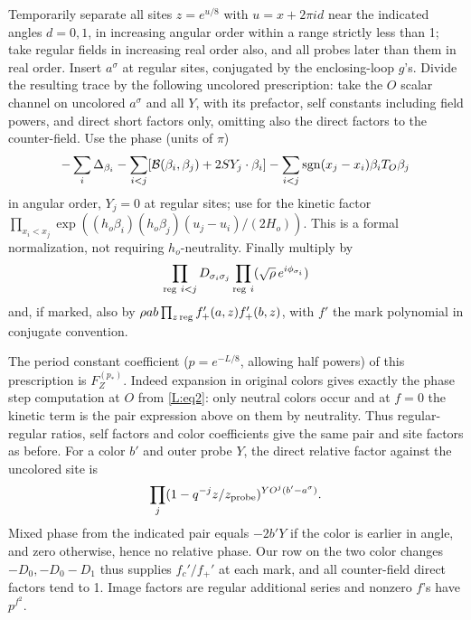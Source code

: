 \documentclass[11pt]{article}
\numberwithin{equation}{section}
\theoremstyle{definition}\newtheorem{definition}[theorem]{Definition}
\theoremstyle{remark}\newtheorem{remark}[theorem]{Remark}
\begin{document}
Temporarily separate all sites \(z=e^{u/8}\) with \(u=x+2\pi i d\) near the indicated angles \(d=0,1\), in increasing angular order within a range strictly less than 1; take regular fields in increasing real order also, and all probes later than them in real order. Insert \(a^\sigma\) at regular sites, conjugated by the enclosing-loop \(g\)'s. Divide the resulting trace by the following uncolored prescription: take the \(O\) scalar channel on uncolored \(a^\sigma\) and all \(Y\), with its prefactor, self constants including field powers, and direct short factors only, omitting also the direct factors to the counter-field. Use the phase (units of \(\pi\))
\[
 -\sum_i\Delta_{\beta_i}-\sum_{i<j}[\mathcal B(\beta_i,\beta_j)+2SY_j\cdot\beta_i]
 -\sum_{i<j}{\rm sgn}(x_j-x_i)\beta_i T_O\beta_j
\]
in angular order, \(Y_j=0\) at regular sites; use for the kinetic factor
\(\prod_{x_i<x_j}\exp((h_o\beta_i)(h_o\beta_j)(u_j-u_i)/(2H_o))\).
This is a formal normalization, not requiring \(h_o\)-neutrality. Finally multiply by
\[
 \prod_{{\rm reg}\ i<j}D_{\sigma_i\sigma_j}
 \prod_{{\rm reg}\ i}(\sqrt\rho\,e^{i\phi_{\sigma_i}})
\]
and, if marked, also by \(\rho ab\prod_{z\,{\rm reg}} f_+'(a,z) f_+'(b,z)\), with \(f'\) the mark polynomial in conjugate convention.

The period constant coefficient (\(p=e^{-L/8}\), allowing half powers) of this prescription is \(F_Z^{(p_*)}\). Indeed expansion in original colors gives exactly the phase step computation at \(O\) from \eqref{L:eq2}: only neutral colors occur and at \(f=0\) the kinetic term is the pair expression above on them by neutrality. Thus regular-regular ratios, self factors and color coefficients give the same pair and site factors as before. For a color \(b'\) and outer probe \(Y\), the direct relative factor against the uncolored site is
\[
  \prod_j(1-q^{-j}z/z_{\rm probe})^{YO^j(b'-a^\sigma)}.
\]
Mixed phase from the indicated pair equals \(-2b'Y\) if the color is earlier in angle, and zero otherwise, hence no relative phase. Our row on the two color changes \(-D_0,-D_0-D_1\) thus supplies \(f_c'/f_+'\) at each mark, and all counter-field direct factors tend to 1. Image factors are regular additional series and nonzero \(f\)'s have \(p^{f^2}\).
\end{document}
